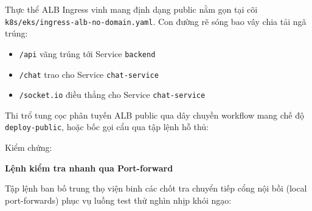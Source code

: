 Thực thể ALB Ingress vinh mang định dạng public nằm gọn tại cõi
\texttt{k8s/\allowbreak{}eks/\allowbreak{}ingress-\allowbreak{}alb-\allowbreak{}no-\allowbreak{}domain.\allowbreak{}yaml}. Con đường rẽ sóng bao vây
chia tải ngã trúng:

\begin{itemize}
\tightlist
\item
  \texttt{/\allowbreak{}api} vãng trúng tới Service \texttt{backend}
\item
  \texttt{/\allowbreak{}chat} trao cho Service \texttt{chat-\allowbreak{}service}
\item
  \texttt{/\allowbreak{}socket.\allowbreak{}io} điều thẳng cho Service \texttt{chat-\allowbreak{}service}
\end{itemize}

Thi trổ tung cọc phân tuyến ALB public qua dây chuyền workflow mang chế
độ \texttt{deploy-\allowbreak{}public}, hoặc bốc gọi cẩu qua tập lệnh hỗ thủ:

\begin{Shaded}
\begin{Highlighting}[]
\OperatorTok{=}
\end{Highlighting}
\end{Shaded}

Kiểm chứng:

\begin{Shaded}
\begin{Highlighting}[]
 
 
\end{Highlighting}
\end{Shaded}

\vspace{0.5em}\noindent\textbf{Lệnh kiểm tra nhanh qua
Port-forward}\par

Tập lệnh ban bố trung thọ viện binh các chốt tra chuyển tiếp cổng nội
bồi (local port-forwards) phục vụ luồng test thử nghìn nhịp khói ngạo:

\begin{Shaded}
\begin{Highlighting}[]
 
\end{Highlighting}
\end{Shaded}

